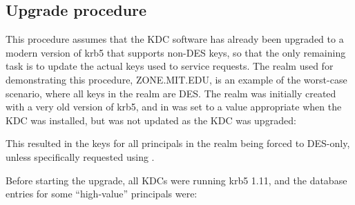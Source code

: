\documentclass[letterpaper,10pt,english]{sphinxmanual}
\begin{document}
\subsection{Upgrade procedure}
\label{\detokenize{admin/advanced/retiring-des:upgrade-procedure}}
This procedure assumes that the KDC software has already been upgraded
to a modern version of krb5 that supports non-DES keys, so that the
only remaining task is to update the actual keys used to service requests.
The realm used for demonstrating this procedure, ZONE.MIT.EDU,
is an example of the worst-case scenario, where all keys in the realm
are DES.  The realm was initially created with a very old version of krb5,
and  in {\hyperref[\detokenize{admin/conf_files/kdc_conf:kdc-conf-5}]{}} was set to a value
appropriate when the KDC was installed, but was not updated as the KDC
was upgraded:

%
\begin{sphinxVerbatim}[commandchars=\\\{\}]
\PYG{p}{[}\PYG{p}{]}
          
                \PYG{p}{[}\PYG{p}{]}
                  
                       
\end{sphinxVerbatim}

This resulted in the keys for all principals in the realm being forced
to DES-only, unless specifically requested using {\hyperref[\detokenize{admin/admin_commands/kadmin_local:kadmin-1}]{}}.

Before starting the upgrade, all KDCs were running krb5 1.11,
and the database entries for some “high-value” principals were:
\end{document}
